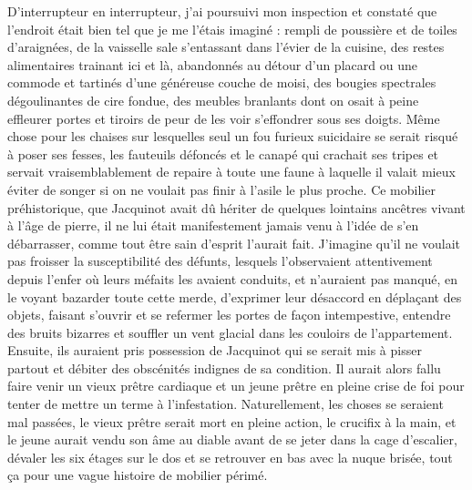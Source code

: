 D’interrupteur en interrupteur, j’ai poursuivi mon inspection et cons\-ta\-té que l’endroit était bien tel que je me l’étais imaginé : rempli de poussière et de toiles d’araignées, de la vaisselle sale s’entassant dans l’évier de la cuisine, des restes alimentaires trainant ici et là, abandonnés au détour d’un placard ou une commode et tartinés d’une généreuse couche de moisi, des bougies spectrales dégoulinantes de cire fondue, des meubles branlants dont on osait à peine effleurer portes et tiroirs de peur de les voir s’effondrer sous ses doigts. Même chose pour les chaises sur lesquelles seul un fou furieux suicidaire se serait risqué à poser ses fesses, les fauteuils défoncés et le canapé qui crachait ses tripes et servait vraisemblablement de repaire à toute une faune à laquelle il valait mieux éviter de songer si on ne voulait pas finir à l’asile le plus proche. Ce mobilier préhistorique, que Jacquinot avait dû hériter de quelques lointains ancêtres vivant à l’âge de pierre, il ne lui était manifestement jamais venu à l’idée de s’en débarrasser, comme tout être sain d’esprit l’aurait fait. J’imagine qu’il ne voulait pas froisser la susceptibilité des défunts, lesquels l’observaient attentivement depuis l’enfer où leurs méfaits les avaient conduits, et n’auraient pas manqué, en le voyant bazarder toute cette merde, d’exprimer leur désaccord en déplaçant des objets, faisant s’ouvrir et se refermer les portes de façon intempestive, entendre des bruits bizarres et souffler un vent glacial dans les couloirs de l’appartement. Ensuite, ils auraient pris possession de Jacquinot qui se serait mis à pisser partout et débiter des obscénités indignes de sa condition. Il aurait alors fallu faire venir un vieux prêtre cardiaque et un jeune prêtre en pleine crise de foi pour tenter de mettre un terme à l’infestation. Naturellement, les choses se seraient mal passées, le vieux prêtre serait mort en pleine action, le crucifix à la main, et le jeune aurait vendu son âme au diable avant de se jeter dans la cage d’escalier, dévaler les six étages sur le dos et se retrouver en bas avec la nuque brisée, tout ça pour une vague histoire de mobilier périmé.


